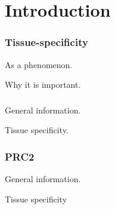\chapter{Introduction}

\subsection*{Tissue-specificity}

As a phenomenon.

Why it is important.


\subsection*{\KRAS{}}

General information.

Tissue specificity.


\subsection*{PRC2}

General information.

Tissue specificity

